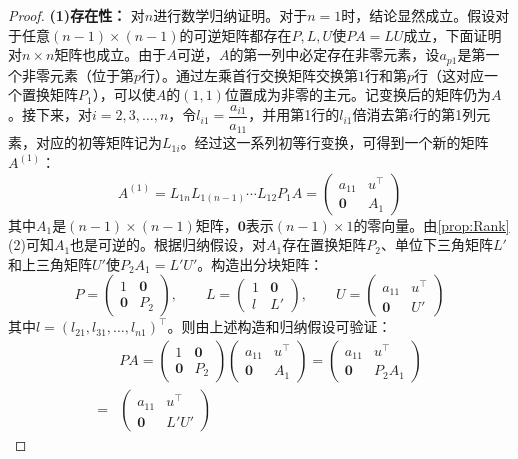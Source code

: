 \begin{proof}
	\textbf{(1)存在性：} 对$n$进行数学归纳证明。对于$n=1$时，结论显然成立。假设对于任意$(n-1)\times(n-1)$的可逆矩阵都存在$P,L,U$使$P A = L U$成立，下面证明对$n\times n$矩阵也成立。由于$A$可逆，$A$的第一列中必定存在非零元素，设$a_{p1}$是第一个非零元素（位于第$p$行）。通过左乘首行交换矩阵交换第$1$行和第$p$行（这对应一个置换矩阵$P_1$），可以使$A$的$(1,1)$位置成为非零的主元。记变换后的矩阵仍为$A$。接下来，对$i=2,3,\dots,n$，令$l_{i1}=\dfrac{a_{i1}}{a_{11}}$，并用第1行的$l_{i1}$倍消去第$i$行的第1列元素，对应的初等矩阵记为$L_{1i}$。经过这一系列初等行变换，可得到一个新的矩阵$A^{(1)}$：
	\[ A^{(1)} = L_{1n}L_{1(n-1)} \cdots L_{12}P_1 A = 
	\begin{pmatrix}
		a_{11} & u^{\top} \\
		\mathbf{0} & A_1
	\end{pmatrix} \] 
	其中$A_1$是$(n-1)\times(n-1)$矩阵，$\mathbf{0}$表示$(n-1)\times 1$的零向量。由\cref{prop:Rank}(2)可知$A_1$也是可逆的。根据归纳假设，对$A_1$存在置换矩阵$P_2$、单位下三角矩阵$L'$和上三角矩阵$U'$使$P_2 A_1 = L' U'$。构造出分块矩阵：
	\[ 
	P = \begin{pmatrix}
		1 & \mathbf{0} \\
		\mathbf{0} & P_2
	\end{pmatrix}, \qquad 
	L = \begin{pmatrix}
		1 & \mathbf{0} \\
		l & L'
	\end{pmatrix}, \qquad 
	U = \begin{pmatrix}
		a_{11} & u^{\top} \\
		\mathbf{0} & U'
	\end{pmatrix}
	\] 
	其中$l=(l_{21},l_{31},\dots,l_{n1})^{\top}$。则由上述构造和归纳假设可验证：
	\begin{align*}
		&PA = \begin{pmatrix} 1 & \mathbf{0} \\ \mathbf{0} & P_2 \end{pmatrix}
		\begin{pmatrix} a_{11} & u^{\top} \\ \mathbf{0} & A_1 \end{pmatrix}
		= \begin{pmatrix} a_{11} & u^{\top} \\ \mathbf{0} & P_2 A_1 \end{pmatrix} \\
		=&\begin{pmatrix} a_{11} & u^{\top} \\ \mathbf{0} & L' U' \end{pmatrix} 

\end{align*}
\end{proof}

